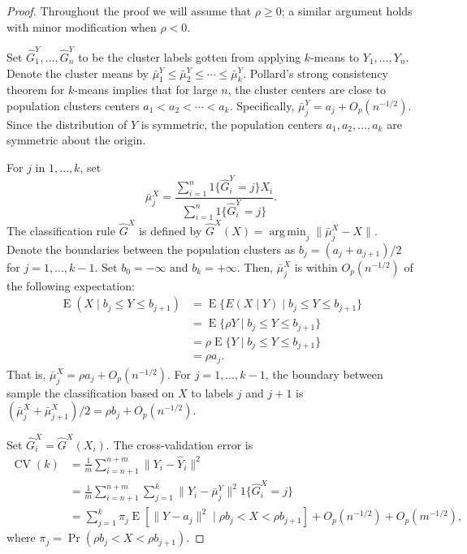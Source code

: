 \documentclass[12pt]{article}
\DeclareMathOperator*{\argmin}{arg\,min}
\newcommand{\CV}{\operatorname{CV}}
\newcommand{\E}{\operatorname{E}}
\newcommand{\OhP}{O_p}
\newcommand{\bmuX}{\bar \mu^{X}}
\newcommand{\bmuY}{\bar \mu^{Y}}
\newcommand{\hGX}{\hat G^{X}}
\newcommand{\hGY}{\hat G^{Y}}
\begin{document}
\begin{proof}

Throughout the proof we will assume that $\rho \geq 0$; a similar argument
holds with minor modification when $\rho < 0$.


Set $\hGY_1, \dotsc, \hGY_n$ to be the cluster labels gotten from applying
$k$-means to $Y_1, \dotsc, Y_n$. Denote the cluster means by $\bmuY_1 \leq
\bmuY_2 \leq \dotsb \leq \bmuY_k$.  Pollard's \citeyearpar{pollard1981strong}
strong consistency theorem for $k$-means implies that for large $n$, the
cluster centers are close to population clusters centers $a_1 < a_2 < \dotsb <
a_k$. Specifically, $\bmuY_j = a_j + \OhP(n^{-1/2})$.  Since the distribution
of $Y$ is symmetric, the population centers $a_1, a_2, \dotsc, a_k$ are
symmetric about the origin.


For $j$ in $1, \dotsc, k$, set
\[
  \bmuX_j = \frac{\sum_{i=1}^{n} 1\{ \hGY_i = j \} X_i}
                 {\sum_{i=1}^{n} 1\{ \hGY_i = j \}}.
\]
The classification rule $\hGX$ is defined by
\(
  \hGX(X) = \argmin_j \| \bmuX_j - X \|.
\)
Denote the boundaries between the population clusters as
$b_j = (a_j + a_{j+1})/2$ for $j = 1, \dotsc, k-1$.
Set $b_0 = -\infty$ and $b_k = +\infty$. 
Then, $\bmuX_j$ is within $\OhP(n^{-1/2})$ of the following expectation:
\begin{align*}
  \E(X \mid b_j \leq Y \leq b_{j+1})
    &= \E\{ E(X \mid Y) \mid b_j \leq Y \leq b_{j+1}\} \\
    &= \E\{ \rho Y \mid b_j \leq Y \leq b_{j+1}\} \\
    &= \rho \E\{ Y \mid b_j \leq Y \leq b_{j+1}\} \\
    &= \rho a_j.
\end{align*}
That is, $\bmuX_j = \rho a_j + \OhP(n^{-1/2})$. For $j = 1, \dotsc, k-1$,
the boundary between sample the classification based on $X$ to
labels $j$ and $j+1$ is
$(\bmuX_j + \bmuX_{j+1}) /2 = \rho b_j + \OhP(n^{-1/2})$.


Set $\hGX_i = \hGX(X_i)$.
The cross-validation error is
\begin{align*}
  \CV(k)
  &= \frac{1}{m} \sum_{i=n+1}^{n+m} \|Y_i - \hat Y_i\|^2
  \\
  &= \frac{1}{m} \sum_{i=n+1}^{n+m}
  \sum_{j=1}^{k} \|Y_i - \bmuY_j\|^2 1\{ \hGX_i = j \}
  \\
  &=
  \sum_{j=1}^{k}
    \pi_j
    \E[ \|Y - a_j\|^2 \mid \rho b_j < X < \rho b_{j+1}]
  + \OhP(n^{-1/2})
  + \OhP(m^{-1/2}),
\end{align*}
where $\pi_j = \Pr(\rho b_j < X < \rho b_{j+1}).$




\end{proof}
\end{document}
